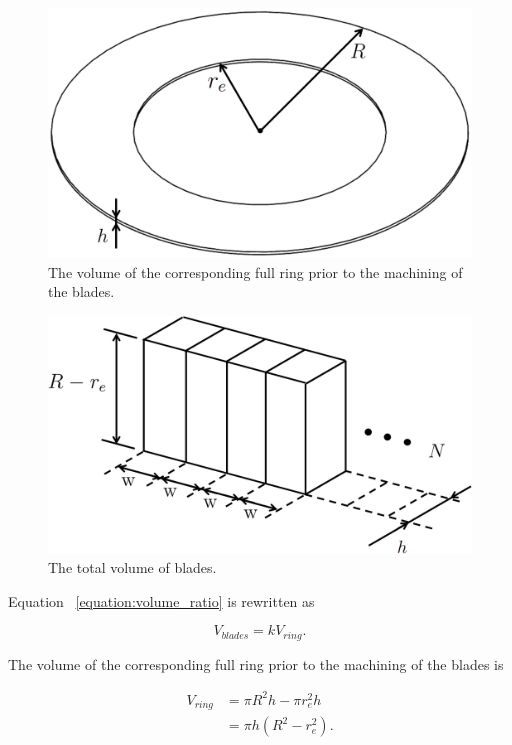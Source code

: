 \documentclass[12pt, a4paper, twoside]{article}
\begin{document}
\begin{figure}[h]
	\centering
	\includegraphics[scale=0.25]{full_ring_prior_to_blade_machining}
	\caption{The volume of the corresponding full ring prior to the machining of the blades.}
	\label{fig:full_ring_prior_to_blade_machining}
\end{figure}

\begin{figure}[h]
	\centering
	\includegraphics[scale=0.3]{total_volume_of_blades}
	\caption{The total volume of blades.}
	\label{fig:total_volume_of_blades}
\end{figure}

Equation ~\ref{equation:volume_ratio} is rewritten as

\begin{equation}
	\label{equation:v_ratio}
	V_{blades} = k V_{ring}.
\end{equation}

The volume of the corresponding full ring prior to the machining of the blades is

\begin{equation}
	\label{equation:v_ring}
	\begin{aligned}
		V_{ring} &= \pi R^2 h - \pi r_e^2 h \\
		&= \pi h (R^2-r_e^2).
	\end{aligned}
\end{equation}
\end{document}
